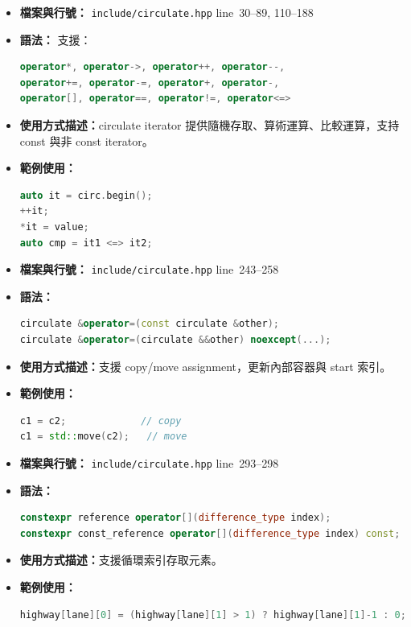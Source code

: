 \documentclass[a4paper,12pt]{article}
\begin{document}
\label{circulate-iterator-operators}
\begin{itemize}
\item \textbf{檔案與行號：} \verb|include/circulate.hpp| line~30--89, 110--188
\item \textbf{語法：} 支援：
\begin{lstlisting}[language=C++]
operator*, operator->, operator++, operator--,
operator+=, operator-=, operator+, operator-,
operator[], operator==, operator!=, operator<=>
\end{lstlisting}
\item \textbf{使用方式描述：}circulate iterator 提供隨機存取、算術運算、比較運算，支持 const 與非 const iterator。
\item \textbf{範例使用：}
\begin{lstlisting}[language=C++]
auto it = circ.begin();
++it;
*it = value;
auto cmp = it1 <=> it2;
\end{lstlisting}
\end{itemize}
\begin{itemize}
\item \textbf{檔案與行號：} \verb|include/circulate.hpp| line~243--258
\item \textbf{語法：}
\begin{lstlisting}[language=C++]
circulate &operator=(const circulate &other);
circulate &operator=(circulate &&other) noexcept(...);
\end{lstlisting}
\item \textbf{使用方式描述：}支援 copy/move assignment，更新內部容器與 start 索引。
\item \textbf{範例使用：}
\begin{lstlisting}[language=C++]
c1 = c2;             // copy
c1 = std::move(c2);   // move
\end{lstlisting}
\end{itemize}
\begin{itemize}
\item \textbf{檔案與行號：} \verb|include/circulate.hpp| line~293--298
\item \textbf{語法：}
\begin{lstlisting}[language=C++]
constexpr reference operator[](difference_type index);
constexpr const_reference operator[](difference_type index) const;
\end{lstlisting}
\item \textbf{使用方式描述：}支援循環索引存取元素。
\item \textbf{範例使用：}
\begin{lstlisting}[language=C++]
highway[lane][0] = (highway[lane][1] > 1) ? highway[lane][1]-1 : 0;
\end{lstlisting}
\end{itemize}
\end{document}
